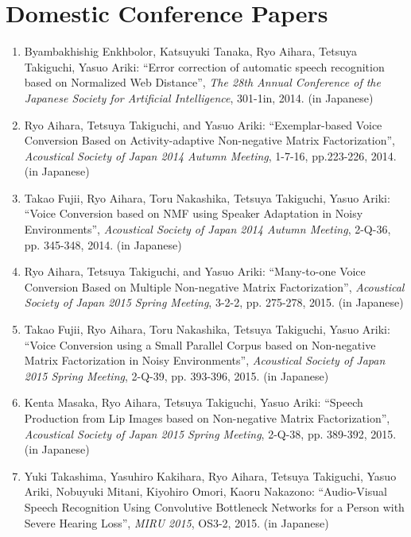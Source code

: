 \section*{Domestic Conference Papers}
\begin{enumerate}
\item Byambakhishig Enkhbolor, Katsuyuki Tanaka, Ryo Aihara, Tetsuya Takiguchi, Yasuo Ariki:
``Error correction of automatic speech recognition based on Normalized Web Distance'',
\textit{The 28th Annual Conference of the Japanese Society for Artificial Intelligence}, 301-1in, 2014. (in Japanese)

\item Ryo Aihara, Tetsuya Takiguchi, and Yasuo Ariki:
``Exemplar-based Voice Conversion Based on Activity-adaptive Non-negative Matrix Factorization'',
\textit{Acoustical Society of Japan 2014 Autumn Meeting}, 1-7-16, pp.223-226, 2014. (in Japanese)

\item Takao Fujii, Ryo Aihara, Toru Nakashika, Tetsuya Takiguchi, Yasuo Ariki:
``Voice Conversion based on NMF using Speaker Adaptation in Noisy Environments'',
\textit{Acoustical Society of Japan 2014 Autumn Meeting}, 2-Q-36, pp. 345-348, 2014. (in Japanese)

\item Ryo Aihara, Tetsuya Takiguchi, and Yasuo Ariki:
``Many-to-one Voice Conversion Based on Multiple Non-negative Matrix Factorization'',
\textit{Acoustical Society of Japan 2015 Spring Meeting}, 3-2-2, pp. 275-278, 2015. (in Japanese)

\item Takao Fujii, Ryo Aihara, Toru Nakashika, Tetsuya Takiguchi, Yasuo Ariki:
``Voice Conversion using a Small Parallel Corpus based on Non-negative Matrix Factorization in Noisy Environments'',
\textit{Acoustical Society of Japan 2015 Spring Meeting}, 2-Q-39, pp. 393-396, 2015. (in Japanese)

\item Kenta Masaka, Ryo Aihara, Tetsuya Takiguchi, Yasuo Ariki:
``Speech Production from Lip Images based on Non-negative Matrix Factorization'',
\textit{Acoustical Society of Japan 2015 Spring Meeting}, 2-Q-38, pp. 389-392, 2015. (in Japanese)

\item Yuki Takashima, Yasuhiro Kakihara, Ryo Aihara, Tetsuya Takiguchi, Yasuo Ariki, Nobuyuki Mitani, Kiyohiro Omori, Kaoru Nakazono:
``Audio-Visual Speech Recognition Using Convolutive Bottleneck Networks for a Person with Severe Hearing Loss'',
\textit{MIRU 2015}, OS3-2, 2015.  (in Japanese)


\end{enumerate}
